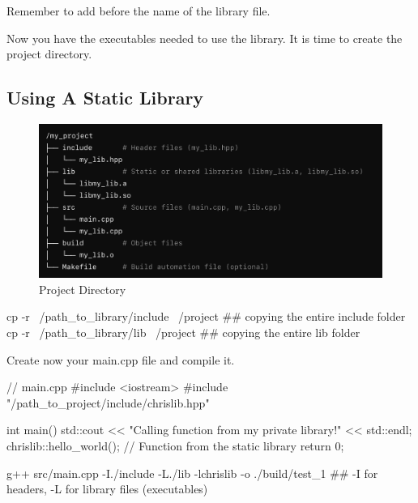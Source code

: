 \begin{warningblock}
    Remember to add  before the name of the library file.
\end{warningblock}

Now you have the executables needed to use the library. It is time to create the project directory.


\subsection*{Using A Static Library}

\begin{figure}[H]
    \centering
    \includegraphics[width=\textwidth]{assets/static_proj_dir.png}
    \caption{Project Directory}
\end{figure}



\begin{codeblock}[language=bash]
    cp -r ~/path_to_library/include ~/project   ## copying the entire include folder
    cp -r ~/path_to_library/lib ~/project   ## copying the entire lib folder
\end{codeblock}

Create now your main.cpp file and compile it.

\begin{codeblock}[language=C++]
    // main.cpp
    #include <iostream>
    #include "/path_to_project/include/chrislib.hpp"
    
    int main() {
        std::cout << "Calling function from my private library!" << std::endl;
        chrislib::hello_world();  // Function from the static library
        return 0;
    }
\end{codeblock}

\vspace{1cm}
\begin{codeblock}[language=bash]
    g++ src/main.cpp -I./include -L./lib -lchrislib -o ./build/test_1   ## -I for headers, -L for library files (executables)
\end{codeblock}

